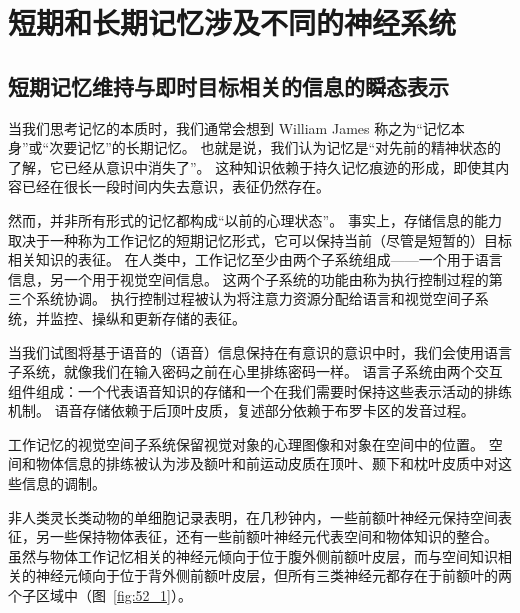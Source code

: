 \section{短期和长期记忆涉及不同的神经系统}

\subsection{短期记忆维持与即时目标相关的信息的瞬态表示}

当我们思考记忆的本质时，我们通常会想到 William James 称之为“记忆本身”或“次要记忆”的长期记忆。
也就是说，我们认为记忆是“对先前的精神状态的了解，它已经从意识中消失了”。
这种知识依赖于持久记忆痕迹的形成，即使其内容已经在很长一段时间内失去意识，表征仍然存在。


然而，并非所有形式的记忆都构成“以前的心理状态”。
事实上，存储信息的能力取决于一种称为工作记忆的短期记忆形式，它可以保持当前（尽管是短暂的）目标相关知识的表征。
在人类中，工作记忆至少由两个子系统组成——一个用于语言信息，另一个用于视觉空间信息。
这两个子系统的功能由称为执行控制过程的第三个系统协调。
执行控制过程被认为将注意力资源分配给语言和视觉空间子系统，并监控、操纵和更新存储的表征。


当我们试图将基于语音的（语音）信息保持在有意识的意识中时，我们会使用语言子系统，就像我们在输入密码之前在心里排练密码一样。
语言子系统由两个交互组件组成：一个代表语音知识的存储和一个在我们需要时保持这些表示活动的排练机制。
语音存储依赖于后顶叶皮质，复述部分依赖于布罗卡区的发音过程。


工作记忆的视觉空间子系统保留视觉对象的心理图像和对象在空间中的位置。
空间和物体信息的排练被认为涉及额叶和前运动皮质在顶叶、颞下和枕叶皮质中对这些信息的调制。


非人类灵长类动物的单细胞记录表明，在几秒钟内，一些前额叶神经元保持空间表征，另一些保持物体表征，还有一些前额叶神经元代表空间和物体知识的整合。
虽然与物体工作记忆相关的神经元倾向于位于腹外侧前额叶皮层，而与空间知识相关的神经元倾向于位于背外侧前额叶皮层，但所有三类神经元都存在于前额叶的两个子区域中（图~\ref{fig:52_1}）。


